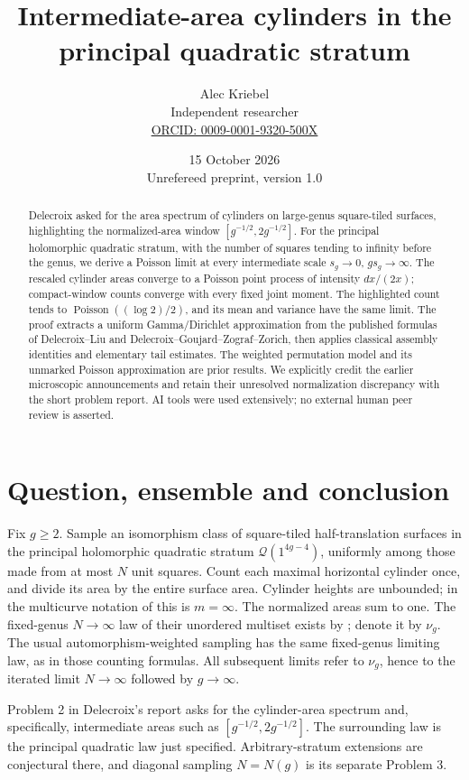 \documentclass[11pt]{article}
\title{Intermediate-area cylinders in the principal quadratic stratum}
\author{Alec Kriebel\\\small Independent researcher\\
\small\href{https://orcid.org/0009-0001-9320-500X}{ORCID: 0009-0001-9320-500X}}
\date{15 October 2026\\\small Unrefereed preprint, version 1.0}
\theoremstyle{remark}\newtheorem{remark}[theorem]{Remark}
\newcommand{\Poi}{\operatorname{Poisson}}\newcommand{\Gam}{\operatorname{Gamma}}
\begin{document}
\maketitle
\begin{abstract}
Delecroix asked for the area spectrum of cylinders on large-genus square-tiled surfaces, highlighting the normalized-area window $[g^{-1/2},2g^{-1/2}]$. For the principal holomorphic quadratic stratum, with the number of squares tending to infinity before the genus, we derive a Poisson limit at every intermediate scale $s_g\to0$, $gs_g\to\infty$. The rescaled cylinder areas converge to a Poisson point process of intensity $dx/(2x)$; compact-window counts converge with every fixed joint moment. The highlighted count tends to $\Poi((\log2)/2)$, and its mean and variance have the same limit. The proof extracts a uniform Gamma/Dirichlet approximation from the published formulas of Delecroix--Liu and Delecroix--Goujard--Zograf--Zorich, then applies classical assembly identities and elementary tail estimates. The weighted permutation model and its unmarked Poisson approximation are prior results. We explicitly credit the earlier microscopic announcements and retain their unresolved normalization discrepancy with the short problem report. AI tools were used extensively; no external human peer review is asserted.
\end{abstract}

\section{Question, ensemble and conclusion}

Fix $g\ge2$. Sample an isomorphism class of square-tiled half-translation surfaces in the principal holomorphic quadratic stratum $\mathcal Q(1^{4g-4})$, uniformly among those made from at most $N$ unit squares. Count each maximal horizontal cylinder once, and divide its area by the entire surface area. Cylinder heights are unbounded; in the multicurve notation of \cite{DL} this is $m=\infty$. The normalized areas sum to one. The fixed-genus $N\to\infty$ law of their unordered multiset exists by \cite[Theorem 1.4]{DL}; denote it by $\nu_g$. The usual automorphism-weighted sampling has the same fixed-genus limiting law, as in those counting formulas. All subsequent limits refer to $\nu_g$, hence to the iterated limit $N\to\infty$ followed by $g\to\infty$.

Problem 2 in Delecroix's report \cite[p.~2387]{OWR} asks for the cylinder-area spectrum and, specifically, intermediate areas such as $[g^{-1/2},2g^{-1/2}]$. The surrounding law is the principal quadratic law just specified. Arbitrary-stratum extensions are conjectural there, and diagonal sampling $N=N(g)$ is its separate Problem 3.
\end{document}
